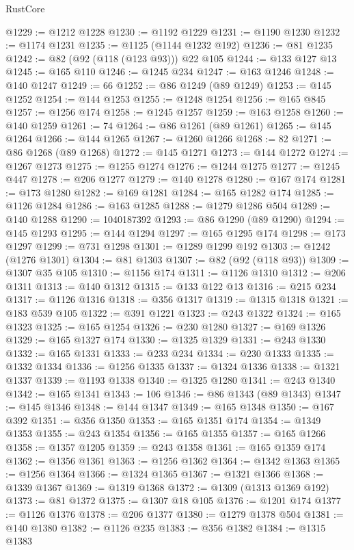 \begin{lexlean}{RustCore}
\begin{coremodule}
@1229 := @1212 @1228
@1230 := @1192 @1229
@1231 := @1190 @1230
@1232 := @1174 @1231
@1235 := @1125 (@1144 @1232 @192)
@1236 := @81 @1235
@1242 := @82 (@92 (@118 (@123 @93))) @22 @105
@1244 := @133 @127 @13
@1245 := @165 @110
@1246 := @1245 @234
@1247 := @163 @1246
@1248 := @140 @1247
@1249 := 66
@1252 := @86 @1249 (@89 @1249)
@1253 := @145 @1252
@1254 := @144 @1253
@1255 := @1248 @1254
@1256 := @165 @845
@1257 := @1256 @174
@1258 := @1245 @1257
@1259 := @163 @1258
@1260 := @140 @1259
@1261 := 74
@1264 := @86 @1261 (@89 @1261)
@1265 := @145 @1264
@1266 := @144 @1265
@1267 := @1260 @1266
@1268 := 82
@1271 := @86 @1268 (@89 @1268)
@1272 := @145 @1271
@1273 := @144 @1272
@1274 := @1267 @1273
@1275 := @1255 @1274
@1276 := @1244 @1275
@1277 := @1245 @447
@1278 := @206 @1277
@1279 := @140 @1278
@1280 := @167 @174
@1281 := @173 @1280
@1282 := @169 @1281
@1284 := @165 @1282 @174
@1285 := @1126 @1284
@1286 := @163 @1285
@1288 := @1279 @1286 @504
@1289 := @140 @1288
@1290 := 1040187392
@1293 := @86 @1290 (@89 @1290)
@1294 := @145 @1293
@1295 := @144 @1294
@1297 := @165 @1295 @174
@1298 := @173 @1297
@1299 := @731 @1298
@1301 := @1289 @1299 @192
@1303 := @1242 (@1276 @1301)
@1304 := @81 @1303
@1307 := @82 (@92 (@118 @93))
@1309 := @1307 @35 @105
@1310 := @1156 @174
@1311 := @1126 @1310
@1312 := @206 @1311
@1313 := @140 @1312
@1315 := @133 @122 @13
@1316 := @215 @234
@1317 := @1126 @1316
@1318 := @356 @1317
@1319 := @1315 @1318
@1321 := @183 @539 @105
@1322 := @391 @1221
@1323 := @243 @1322
@1324 := @165 @1323
@1325 := @165 @1254
@1326 := @230 @1280
@1327 := @169 @1326
@1329 := @165 @1327 @174
@1330 := @1325 @1329
@1331 := @243 @1330
@1332 := @165 @1331
@1333 := @233 @234
@1334 := @230 @1333
@1335 := @1332 @1334
@1336 := @1256 @1335
@1337 := @1324 @1336
@1338 := @1321 @1337
@1339 := @1193 @1338
@1340 := @1325 @1280
@1341 := @243 @1340
@1342 := @165 @1341
@1343 := 106
@1346 := @86 @1343 (@89 @1343)
@1347 := @145 @1346
@1348 := @144 @1347
@1349 := @165 @1348
@1350 := @167 @392
@1351 := @356 @1350
@1353 := @165 @1351 @174
@1354 := @1349 @1353
@1355 := @243 @1354
@1356 := @165 @1355
@1357 := @165 @1266
@1358 := @1357 @1205
@1359 := @243 @1358
@1361 := @165 @1359 @174
@1362 := @1356 @1361
@1363 := @1256 @1362
@1364 := @1342 @1363
@1365 := @1256 @1364
@1366 := @1324 @1365
@1367 := @1321 @1366
@1368 := @1339 @1367
@1369 := @1319 @1368
@1372 := @1309 (@1313 @1369 @192)
@1373 := @81 @1372
@1375 := @1307 @18 @105
@1376 := @1201 @174
@1377 := @1126 @1376
@1378 := @206 @1377
@1380 := @1279 @1378 @504
@1381 := @140 @1380
@1382 := @1126 @235
@1383 := @356 @1382
@1384 := @1315 @1383

\end{coremodule}
\end{lexlean}
